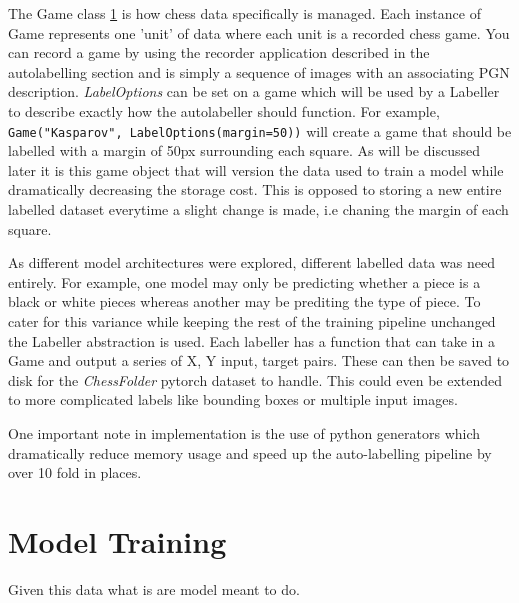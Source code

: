 The Game class \ref{} is how chess data specifically is managed.  Each instance of Game represents one 'unit' of data where each unit is a recorded chess game.
You can record a game by using the recorder application described in the autolabelling section and is simply a sequence of images with
an associating PGN description. \textit{LabelOptions} can be set on a game which will be used by a Labeller to describe exactly how the autolabeller 
should function.  For example, \verb|Game("Kasparov", LabelOptions(margin=50))| will create a game that should be labelled
with a margin of 50px surrounding each square.  As will be discussed later it is this game object that will version the data used to train a model while dramatically
decreasing the storage cost.  This is opposed to storing a new entire labelled dataset everytime a slight change is made, i.e chaning the margin of each square.

As different model architectures were explored, different labelled data was need entirely.  For example, one model may only be 
predicting whether a piece is a black or white pieces whereas another may be prediting the type of piece.  To cater for this variance while keeping the rest of the 
training pipeline unchanged the Labeller abstraction is used.  Each labeller has a function that can take in a Game and output a series of X, Y input, target pairs.
These can then be saved to disk for the \textit{ChessFolder} pytorch dataset to handle. 
This could even be extended to more complicated labels like bounding boxes or multiple input images.

One important note in implementation is the use of python generators which dramatically reduce memory usage and speed up the auto-labelling pipeline by over 10 fold in 
places.

\section{Model Training}
Given this data what is are model meant to do.

